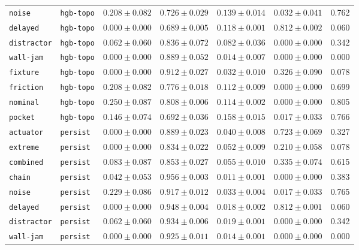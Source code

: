 \documentclass{article}
\begin{document}
\begin{center}
\begin{tabular}{llccccc}
\texttt{noise} & \texttt{hgb-topo} & $0.208 \pm 0.082$ & $0.726 \pm 0.029$ & $0.139 \pm 0.014$ & $0.032 \pm 0.041$ & 0.762 \\
\texttt{delayed} & \texttt{hgb-topo} & $0.000 \pm 0.000$ & $0.689 \pm 0.005$ & $0.118 \pm 0.001$ & $0.812 \pm 0.002$ & 0.060 \\
\texttt{distractor} & \texttt{hgb-topo} & $0.062 \pm 0.060$ & $0.836 \pm 0.072$ & $0.082 \pm 0.036$ & $0.000 \pm 0.000$ & 0.342 \\
\texttt{wall-jam} & \texttt{hgb-topo} & $0.000 \pm 0.000$ & $0.889 \pm 0.052$ & $0.014 \pm 0.007$ & $0.000 \pm 0.000$ & 0.000 \\
\texttt{fixture} & \texttt{hgb-topo} & $0.000 \pm 0.000$ & $0.912 \pm 0.027$ & $0.032 \pm 0.010$ & $0.326 \pm 0.090$ & 0.078 \\
\texttt{friction} & \texttt{hgb-topo} & $0.208 \pm 0.082$ & $0.776 \pm 0.018$ & $0.112 \pm 0.009$ & $0.000 \pm 0.000$ & 0.699 \\
\texttt{nominal} & \texttt{hgb-topo} & $0.250 \pm 0.087$ & $0.808 \pm 0.006$ & $0.114 \pm 0.002$ & $0.000 \pm 0.000$ & 0.805 \\
\texttt{pocket} & \texttt{hgb-topo} & $0.146 \pm 0.074$ & $0.692 \pm 0.036$ & $0.158 \pm 0.015$ & $0.017 \pm 0.033$ & 0.766 \\
\texttt{actuator} & \texttt{persist} & $0.000 \pm 0.000$ & $0.889 \pm 0.023$ & $0.040 \pm 0.008$ & $0.723 \pm 0.069$ & 0.327 \\
\texttt{extreme} & \texttt{persist} & $0.000 \pm 0.000$ & $0.834 \pm 0.022$ & $0.052 \pm 0.009$ & $0.210 \pm 0.058$ & 0.078 \\
\texttt{combined} & \texttt{persist} & $0.083 \pm 0.087$ & $0.853 \pm 0.027$ & $0.055 \pm 0.010$ & $0.335 \pm 0.074$ & 0.615 \\
\texttt{chain} & \texttt{persist} & $0.042 \pm 0.053$ & $0.956 \pm 0.003$ & $0.011 \pm 0.001$ & $0.000 \pm 0.000$ & 0.383 \\
\texttt{noise} & \texttt{persist} & $0.229 \pm 0.086$ & $0.917 \pm 0.012$ & $0.033 \pm 0.004$ & $0.017 \pm 0.033$ & 0.765 \\
\texttt{delayed} & \texttt{persist} & $0.000 \pm 0.000$ & $0.948 \pm 0.004$ & $0.018 \pm 0.002$ & $0.812 \pm 0.001$ & 0.060 \\
\texttt{distractor} & \texttt{persist} & $0.062 \pm 0.060$ & $0.934 \pm 0.006$ & $0.019 \pm 0.001$ & $0.000 \pm 0.000$ & 0.342 \\
\texttt{wall-jam} & \texttt{persist} & $0.000 \pm 0.000$ & $0.925 \pm 0.011$ & $0.014 \pm 0.001$ & $0.000 \pm 0.000$ & 0.000 \\

\end{tabular}
\end{center}
\end{document}
